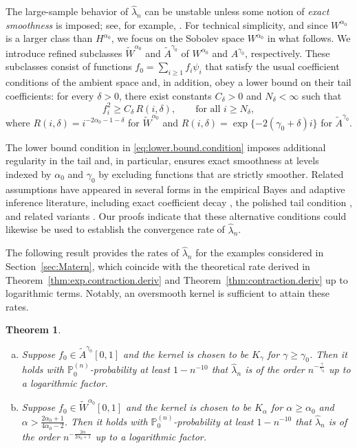 \documentclass[12pt]{article}
\newcommand{\PP}{\mathbb{P}}
\theoremstyle{plain}
\newtheorem{theorem}{Theorem}
\theoremstyle{nonitalicremark}
\begin{document}
The large-sample behavior of $\hat\lambda_n$ can be unstable unless some notion of \textit{exact smoothness} is imposed; see, for example,
\cite{szabo2013empirical}. For technical simplicity, and since
$W^{\alpha_0}$ is a larger class than $H^{\alpha_0}$, we focus on the Sobolev space $W^{\alpha_0}$ in what follows. We introduce refined subclasses $\widetilde W^{\alpha_0}$ and
$\widetilde A^{\gamma_0}$ of $W^{\alpha_0}$ and $A^{\gamma_0}$, respectively.
These subclasses consist of functions
$f_0=\sum_{i\ge1} f_i\psi_i$ that satisfy the usual coefficient conditions of the
ambient space and, in addition, obey a lower bound on their tail coefficients: for every $\delta>0$, there exist constants $C_\delta>0$ and
$N_\delta<\infty$ such that
\begin{equation}\label{eq:lower.bound.condition}
f_i^2 \ge C_\delta\, R(i,\delta), \qquad \text{for all } i \ge N_\delta,
\end{equation}
where $R(i,\delta)= i^{-2\alpha_0-1-\delta}$ for $\widetilde W^{\alpha_0}$ and
$R(i,\delta)= \exp\{-2(\gamma_0+\delta)i\}$ for $\widetilde A^{\gamma_0}$.

The lower bound condition in \eqref{eq:lower.bound.condition} imposes additional regularity in the tail and, in particular, ensures exact smoothness at levels indexed by $\alpha_0$ and $\gamma_0$ by excluding functions that are strictly smoother. Related assumptions
have appeared in several forms in the empirical Bayes and adaptive inference
literature, including exact coefficient decay \citep{szabo2013empirical}, the
polished tail condition \citep{szabo2015frequentist}, and related variants
\citep{gine2010confidence,bull2012honest}. Our proofs indicate that these
alternative conditions could likewise be used to establish the convergence rate of
$\hat\lambda_n$.

The following result provides the rates of $\hat\lambda_n$ for the examples considered in Section~\ref{sec:Matern}, which coincide with the theoretical rate derived in Theorem~\ref{thm:exp.contraction.deriv} and Theorem~\ref{thm:contraction.deriv} up to logarithmic terms. Notably, an oversmooth kernel is sufficient to attain these rates. 


\begin{theorem}\label{thm:lambda.mmle}
\begin{enumerate}[(a)]
\item Suppose $f_0\in \widetilde{A}^{\gamma_0}[0,1]$ and the kernel is chosen to be $K_\gamma$ for $\gamma \geq \gamma_0$. Then it holds with $\PP_0^{(n)}$-probability at least $1-n^{-10}$ that $\hat\lambda_n$ is of the order $n^{-\frac{\gamma}{\gamma_0}}$ up to a logarithmic factor.
\item Suppose $f_0 \in \widetilde{W}^{\alpha_0}[0,1]$ and the kernel is chosen to be $K_\alpha$ for $\alpha \geq \alpha_0$ and $\alpha > \frac{2\alpha_0+1}{4\alpha_0-2}$. Then it holds with $\PP_0^{(n)}$-probability at least $1-n^{-10}$ that $\hat \lambda_n$ is of the order $n^{-\frac{2\alpha}{2\alpha_0+1}}$ up to a logarithmic factor.
\end{enumerate}
\end{theorem}
\end{document}

